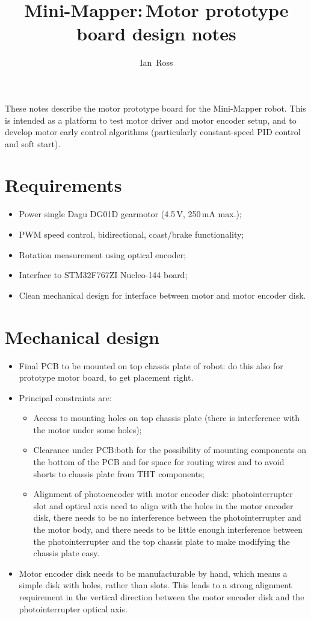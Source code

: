 \documentclass[a4paper,11pt,article]{memoir}
\title{Mini-Mapper:\,Motor prototype board design notes}
\author{Ian~Ross}
\begin{document}
\maketitle

These notes describe the motor prototype board for the Mini-Mapper
robot. This is intended as a platform to test motor driver and motor
encoder setup, and to develop motor early control algorithms
(particularly constant-speed PID control and soft start).


\section{Requirements}

\begin{itemize}
  \item{Power single Dagu DG01D gearmotor (4.5\,V, 250\,mA max.);}
  \item{PWM speed control, bidirectional, coast/brake functionality;}
  \item{Rotation measurement using optical encoder;}
  \item{Interface to STM32F767ZI Nucleo-144 board;}
  \item{Clean mechanical design for interface between motor and motor
    encoder disk.}
\end{itemize}


\section{Mechanical design}

\begin{itemize}
  \item{Final PCB to be mounted on top chassis plate of robot: do this
    also for prototype motor board, to get placement right.}
  \item{Principal constraints are:
    \begin{itemize}
      \item{Access to mounting holes on top chassis plate
        (there is interference with the motor under some holes);}
      \item{Clearance under PCB:\@{}both for the possibility of
        mounting components on the bottom of the PCB and for space for
        routing wires and to avoid shorts to chassis plate from THT
        components;}
      \item{Alignment of photoencoder with motor encoder disk:
        photointerrupter slot and optical axis need to align with the
        holes in the motor encoder disk, there needs to be no
        interference between the photointerrupter and the motor body,
        and there needs to be little enough interference between the
        photointerrupter and the top chassis plate to make modifying
        the chassis plate easy.}
  \end{itemize}}
  \item{Motor encoder disk needs to be manufacturable by hand, which
    means a simple disk with holes, rather than slots. This leads to a
    strong alignment requirement in the vertical direction between the
    motor encoder disk and the photointerrupter optical axis.}
\end{itemize}
\end{document}
